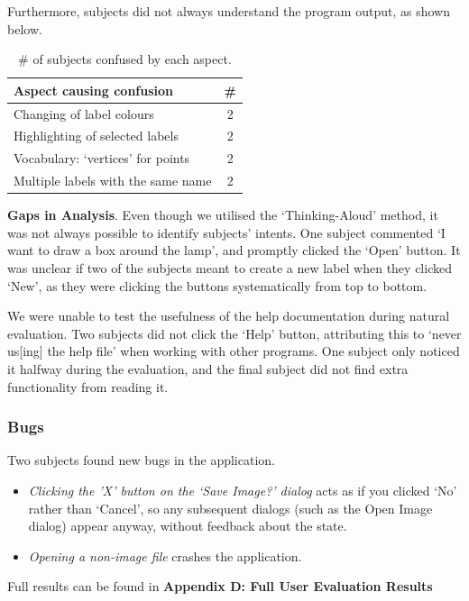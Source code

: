 \documentclass[11pt,twocolumn]{article}
\begin{document}
Furthermore, subjects did not always understand the program output, as shown below.

\begin{table}[h!]
\centering
\begin{tabular}{|l|c|}
\hline
{\bf Aspect causing confusion} & {\bf \#} \\
\hline
Changing of label colours & 2 \\
Highlighting of selected labels & 2 \\
Vocabulary: `vertices' for points & 2 \\
Multiple labels with the same name & 2 \\
\hline
\end{tabular}
\caption{\# of subjects confused by each aspect.}
\label{confusion}
\end{table}

{\bf Gaps in Analysis}. Even though we utilised the `Thinking-Aloud' method, it was not always possible to identify subjects’ intents. One subject commented `I want to draw a box around the lamp', and promptly clicked the `Open' button. It was unclear if two
of the subjects meant to create a new label when they clicked `New', as they were clicking the buttons systematically from top to bottom.

We were unable to test the usefulness of the help documentation during natural evaluation. Two subjects did not click the `Help' button, attributing this to `never us[ing] the help file' when working with other programs. One subject only noticed it halfway during the evaluation, and the final subject did not find extra functionality from reading it.

\subsubsection{Bugs}

Two subjects found new bugs in the application. 
\begin{itemize}
\item \emph{Clicking the 'X' button on the `Save Image?' dialog} acts as if you clicked `No' rather than `Cancel', so any subsequent dialogs (such as the Open Image dialog) appear
anyway, without feedback about the state. 
\item \emph{ Opening a non-image file} crashes the application.
\end{itemize}

\noindent Full results can be found in \textbf{Appendix D: Full User Evaluation Results}
\end{document}
